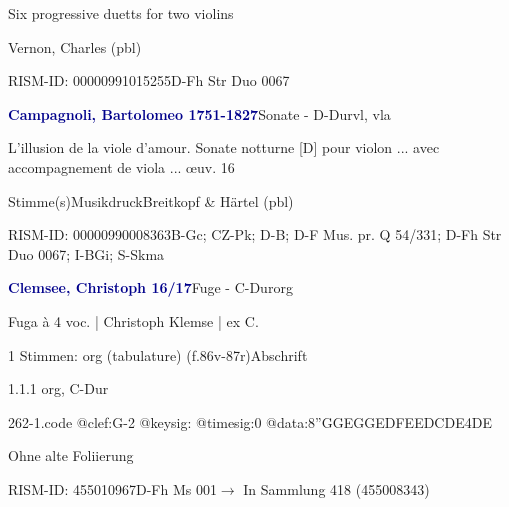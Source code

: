 \documentclass[twocolumn]{book}
\begin{document}
\par \begin{itshape}Six progressive duetts for two violins\end{itshape} \newline Vernon, Charles  (pbl)
\par RISM-ID: 00000991015255\newline D-Fh  Str Duo 0067
\par \vspace{7pt} \textcolor{darkblue}{\textbf{Campagnoli, Bartolomeo  1751-1827}}\hfillplus{\textbf{[261]}}\newline Sonate - D-Dur\newline vl, vla
\par \begin{itshape}L'illusion de la viole d'amour. Sonate notturne [D] pour violon ... avec accompagnement de viola ... œuv. 16\end{itshape} 
\par \textcolor{darkblue}{}  Stimme(s)\newline Musikdruck\newline Breitkopf \& Härtel  (pbl)
\par RISM-ID: 00000990008363\newline B-Gc; CZ-Pk; D-B; D-F  Mus. pr. Q 54/331; D-Fh  Str Duo 0067; I-BGi; S-Skma
\par \vspace{7pt} \textcolor{darkblue}{\textbf{Clemsee, Christoph  16/17}}\hfillplus{\textbf{[262]}}\newline Fuge - C-Dur\newline org
\par \begin{itshape}[f.86v, at left:] Fuga à 4 voc. | Christoph Klemse | ex C.\end{itshape} 
\par \textcolor{darkblue}{}  1 Stimmen: org (tabulature)  (f.86v-87r)\newline Abschrift
\par 1.1.1  org, C-Dur  
\begin{filecontents*}{262-1.code}
@clef:G-2
@keysig:
@timesig:0
@data:{8''GGEG}{GEDF}{EEDC}{DE}4DE
\end{filecontents*}
\newline
%
\par Ohne alte Foliierung
\par RISM-ID: 455010967\newline D-Fh  Ms 001\newline $\rightarrow$ In Sammlung 418 (455008343)
      
\end{document}
